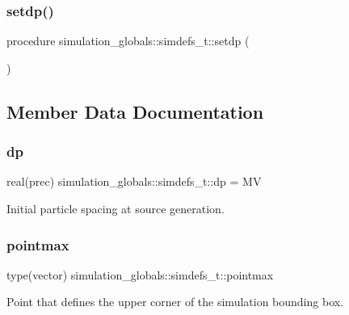 \subsubsection{\texorpdfstring{setdp()}{setdp()}}
{\footnotesize\ttfamily procedure simulation\+\_\+globals\+::simdefs\+\_\+t\+::setdp (\begin{DoxyParamCaption}{ }\end{DoxyParamCaption})\hspace{0.3cm}{\ttfamily [private]}}



\subsection{Member Data Documentation}
\mbox{\label{structsimulation__globals_1_1simdefs__t_a416b838aca82edb2df262f5f503a00ae}} 
\subsubsection{\texorpdfstring{dp}{dp}}
{\footnotesize\ttfamily real(prec) simulation\+\_\+globals\+::simdefs\+\_\+t\+::dp = MV\hspace{0.3cm}{\ttfamily [private]}}



Initial particle spacing at source generation. 

\mbox{\label{structsimulation__globals_1_1simdefs__t_a8c7a365078a69252312ea200c619bcb6}} 
\subsubsection{\texorpdfstring{pointmax}{pointmax}}
{\footnotesize\ttfamily type(vector) simulation\+\_\+globals\+::simdefs\+\_\+t\+::pointmax\hspace{0.3cm}{\ttfamily [private]}}



Point that defines the upper corner of the simulation bounding box. 

